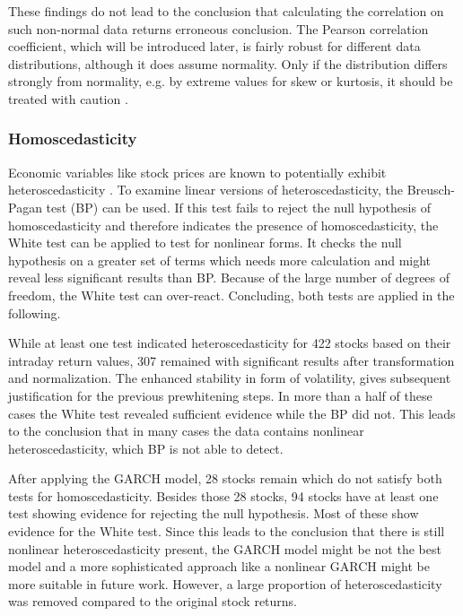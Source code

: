 These findings do not lead to the conclusion that calculating the correlation on such non-normal data returns erroneous conclusion. The Pearson correlation coefficient, which will be introduced later, is fairly robust for different data distributions, although it does assume normality. Only if the distribution differs strongly from normality, e.g. by extreme values for skew or kurtosis, it should be treated with caution \cite{Bishara2012TestingApproaches}.



\subsubsection{Homoscedasticity}
\label{subsubsection:homoscedasticity}

Economic variables like stock prices are known to potentially exhibit heteroscedasticity \cite{Salisu2016UnitSeries}. To examine linear versions of heteroscedasticity, the Breusch-Pagan test (BP) \cite{Breusch1979AVariation} can be used. If this test fails to reject the null hypothesis of homoscedasticity and therefore indicates the presence of homoscedasticity, the White test \cite{White1980AHeteroskedasticity} can be applied to test for nonlinear forms. It checks the null hypothesis on a greater set of terms which needs more calculation and might reveal less significant results than BP. Because of the large number of degrees of freedom, the White test can over-react. Concluding, both tests are applied in the following. %

While at least one test indicated heteroscedasticity for 422 stocks based on their intraday return values, 307 remained with significant results after transformation and normalization. The enhanced stability in form of volatility, gives subsequent justification for the previous prewhitening steps. In more than a half of these cases the White test revealed sufficient evidence while the BP did not. This leads to the conclusion that in many cases the data contains nonlinear heteroscedasticity, which BP is not able to detect.

After applying the GARCH model, 28 stocks remain which do not satisfy both tests for homoscedasticity. Besides those 28 stocks, 94 stocks have at least one test showing evidence for rejecting the null hypothesis. Most of these show evidence for the White test. Since this leads to the conclusion that there is still nonlinear heteroscedasticity present, the GARCH model might be not the best model and a more sophisticated approach like a nonlinear GARCH might be more suitable in future work. However, a large proportion of heteroscedasticity was removed compared to the original stock returns.

